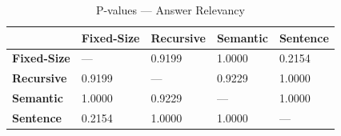 \begin{table}
\caption{P-values — Answer Relevancy}
\label{tab:pvalues_answer_relevancy}
\begin{tabular}{lllll}
\toprule
 & Fixed-Size & Recursive & Semantic & Sentence \\
\midrule
\textbf{Fixed-Size} & — & 0.9199 & 1.0000 & 0.2154 \\
\textbf{Recursive} & 0.9199 & — & 0.9229 & 1.0000 \\
\textbf{Semantic} & 1.0000 & 0.9229 & — & 1.0000 \\
\textbf{Sentence} & 0.2154 & 1.0000 & 1.0000 & — \\
\bottomrule
\end{tabular}
\end{table}
